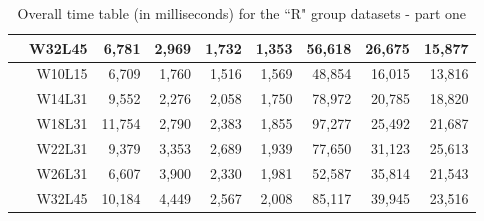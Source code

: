 \begin{table}[!ht]
\begin{tabular}{c r | rrrr | rrr}
		& W32L45 & 6,781 & 2,969 & 1,732 & 1,353 & 56,618 & 26,675 & 15,877 \\
		\midrule
		\multirow{6}{*}{\rotatebox[origin=c]{90}{\textbf{R500}}}
		& W10L15 & 6,709 & 1,760 & 1,516 & 1,569 & 48,854 & 16,015 & 13,816 \\
		& W14L31 & 9,552 & 2,276 & 2,058 & 1,750 & 78,972 & 20,785 & 18,820 \\
		& W18L31 & 11,754 & 2,790 & 2,383 & 1,855 & 97,277 & 25,492 & 21,687 \\
		& W22L31 & 9,379 & 3,353 & 2,689 & 1,939 & 77,650 & 31,123 & 25,613 \\
		& W26L31 & 6,607 & 3,900 & 2,330 & 1,981 & 52,587 & 35,814 & 21,543 \\
		& W32L45 & 10,184 & 4,449 & 2,567 & 2,008 & 85,117 & 39,945 & 23,516 \\
		\bottomrule
	\end{tabular}
	\caption{Overall time table (in milliseconds) for the “R" group datasets - part one}
	\label{tab:time-gruppoR-pt1}
\end{table}
\clearpage

